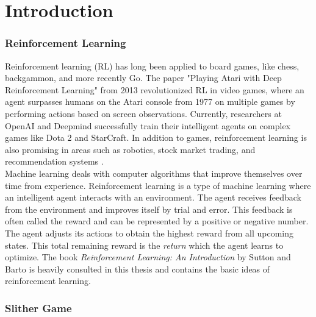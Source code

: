 \section{Introduction}

\subsubsection*{Reinforcement Learning}
Reinforcement learning (RL) has long been applied to board games, like chess, backgammon, and more recently Go. The paper "Playing Atari with Deep Reinforcement Learning" \cite{Atari_DQN_2013} from 2013 revolutionized RL in video games, where an agent surpasses humans on the Atari console from 1977 on multiple games by performing actions based on screen observations. Currently, researchers at OpenAI and Deepmind successfully train their intelligent agents on complex games like Dota 2 and StarCraft. In addition to games, reinforcement learning is also promising in areas such as robotics, stock market trading, and recommendation systems \cite{web:RL_Applications}.
\\[2.5mm]
Machine learning deals with computer algorithms that improve themselves over time from experience. Reinforcement learning is a type of machine learning where an intelligent agent interacts with an environment. The agent receives feedback from the environment and improves itself by trial and error. This feedback is often called the reward and can be represented by a positive or negative number. The agent adjusts its actions to obtain the highest reward from all upcoming states. This total remaining reward is the \textit{return} which the agent learns to optimize. The book \textit{Reinforcement Learning: An Introduction} by Sutton and Barto \cite{RL_Book_Sutton_Barto} is heavily consulted in this thesis and contains the basic ideas of reinforcement learning.


\subsubsection*{Slither Game}

